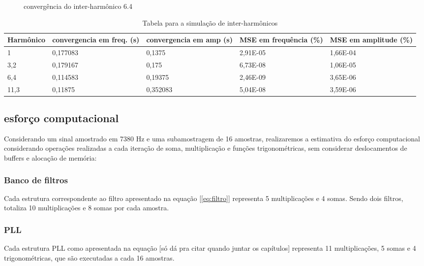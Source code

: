 \documentclass[a4paper, 12pt]{book}
\begin{document}
\begin{figure}[h]
	\centering    
	\def\svgscale{1}
	
	\caption{convergência do inter-harmônico 6.4}
	\label{fig:esquema_pll}
\end{figure}

\begin{table}[h]
	\centering
	\begin{tabular}{|p{2.5cm}|p{2.5cm}|p{2.5cm}|p{2.5cm}|p{2.5cm}|}
		\hline
		Harmônico & convergencia em freq. (s)& convergencia em amp (s) & MSE em frequência (\%) & MSE em amplitude (\%)\\
		\hline
		1    & 0,177083 & 0,1375   & 2,91E-05 & 1,66E-04 \\
		3,2  & 0,179167 & 0,175    & 6,73E-08 & 1,06E-05 \\
		6,4  & 0,114583 & 0,19375  & 2,46E-09 & 3,65E-06 \\
		11,3 & 0,11875  & 0,352083 & 5,04E-08 & 3,59E-06 \\
		\hline
	\end{tabular}
	\caption{Tabela para a simulação de inter-harmônicos}
\end{table}


\subsection{esforço computacional}

\indent Considerando um sinal amostrado em 7380  Hz e uma subamostragem de 16 amostras, realizaremos a estimativa do esforço computacional considerando operações realizadas a cada iteração de soma, multiplicação e funções trigonométricas, sem considerar deslocamentos de buffers e alocação de memória:

\subsubsection{Banco de filtros}

\indent Cada estrutura correspondente ao filtro apresentado na equação [\ref{eq:filtro}] representa 5 multiplicações e 4 somas. Sendo dois filtros, totaliza 10 multiplicações e 8 somas por cada amostra.

\subsubsection{PLL}

\indent Cada estrutura PLL como apresentada na equação [só dá pra citar quando juntar os capítulos] representa 11 multiplicações, 5 somas e 4 trigonométricas, que são executadas a cada 16 amostras. 
\end{document}
